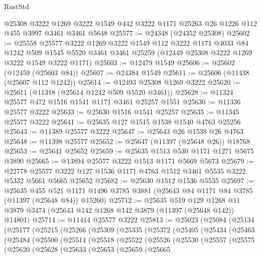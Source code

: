 \begin{lexlean}{RustStd}
\begin{coremodule}
    @25308
    @3222
    @1269
    @3222
    @1549
    @442
    @3222
    @1171
    @25263
    @26
    @1226
    @112
    @455
    @3997
    @3461
    @3461
    @5648
@25577 := @24348 (@24352 @25308)
@25602 := @25558
    @25577
    @3222
    @1269
    @3222
    @1549
    @112
    @3222
    @1171
    @4033
    @84
    @1242
    @509
    @1545
    @5520
    @3461
    @3461
    @25259
    (@12449 @25308 @3222 @1269 @3222 @1549 @3222 @1171)
@25603 := @12479 @1549
@25606 := @25602 (@12459 (@25603 @84))
@25607 := @24384 @1549
@25611 := @25606 (@11438 (@25607 @112 @1242))
@25614 := @12493 @25308 @1269 @3222
@25620 := @25611 (@11318 (@25614 @1242 @509 @5520 @3461))
@25628 := @11324 @25577 @472 @1516 @1541 @1171 @3461 @25257 @1551
@25630 := @11336 @25577 @3222
@25633 := @25630 @1516 @1541 @25257
@25635 := @11345 @25577 @3222
@25641 := @25635 @127 @1515 @1538 @1540 @4763 @25256
@25643 := @11389 @25577 @3222
@25647 := @25643 @26 @1538 @26 @4763
@25648 := @11398 @25577
@25652 := @25647 (@11397 (@25648 @26)) @18768
@25653 := @25641 @25652
@25659 := @25635 @1513 @530 @1171 @1271 @5675 @3890
@25665 := @13894 @25577 @3222 @1513 @1171 @5669 @5673
@25679 := @22778
    @25577
    @3222
    @127
    @1536
    @1171
    @4763
    @1512
    @3461
    @5535
    @3222
    @5332
    @5661
    @5665
    @25652
@25682 := @25630 @1512 @1536 @5535
@25697 := @25635
    @455
    @521
    @1171
    @1496
    @3785
    @3881
    (@25643 @84 @1171 @84 @3785 (@11397 (@25648 @84)) @15260)
@25712 := @25635
    @519
    @129
    @1268
    @11
    @3879
    @3474
    (@25643 @142 @1268 @142 @3879 (@11397 (@25648 @142)) @14801)
@25714 := @11414 @25577 @3222
@25813 := @25023
    (@25084
      (@25134
        (@25177
          (@25215
            (@25266
              (@25309
                (@25335
                  (@25372
                    (@25405
                      (@25434
                        (@25463
                          (@25484
                            (@25500
                              (@25514
                                (@25518
                                  (@25522
                                    (@25526
                                      (@25530
                                        (@25557
                                          (@25575
                                            (@25620
                                              (@25628
                                                (@25633
                                                  (@25653
                                                    (@25659
                                                      (@25665

\end{coremodule}
\end{lexlean}
